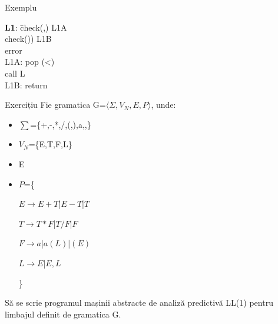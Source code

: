 \documentclass[pdf]{beamer}
\begin{document}
\begin{frame}{Exemplu}
\begin{tabbing}
\textbf{L1}: \= check(,) L1A\\
    \> check()) L1B\\
    \> error\\
L1A: pop (<)\\
     \> call L\\
L1B: return\\
\end{tabbing}
\end{frame}



\begin{frame}{Exercițiu}
Fie gramatica G=$\langle \Sigma, V_N, E, P \rangle$, unde:

\begin{itemize}
\item
$\sum$=\{+,-,*,/,(,),a,,\}
\item
$V_N$=\{E,T,F,L\}
\item
E
\item
$P$=\{

\hspace{1cm} $E\rightarrow E+T $|$ E-T$|$ T$

\hspace{1cm} $T\rightarrow T*F$|$T/F$|$ F$

\hspace{1cm} $F\rightarrow a $|$ a(L) $|$ (E)$

\hspace{1cm} $L\rightarrow E $|$ E,L$

\}
\end{itemize}

Să se scrie programul mașinii abstracte de analiză predictivă LL(1) pentru limbajul definit de gramatica G.
\end{frame}
\end{document}
